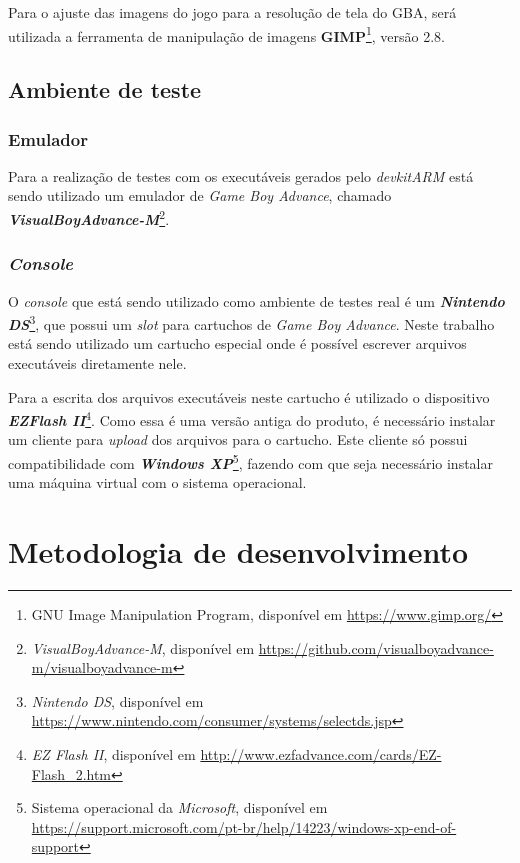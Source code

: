    Para o ajuste das imagens do jogo para a resolução de tela do GBA, será utilizada a ferramenta de manipulação de imagens \textbf{GIMP}\footnote{GNU Image Manipulation Program, disponível em \url{https://www.gimp.org/}}, versão 2.8.

  \subsection{Ambiente de teste}

    \subsubsection{Emulador}

      Para a realização de testes com os executáveis gerados pelo \textit{devkitARM} está sendo utilizado um emulador de \textit{Game Boy Advance}, chamado \textbf{\textit{VisualBoyAdvance-M}}\footnote{\textit{VisualBoyAdvance-M}, disponível em \url{https://github.com/visualboyadvance-m/visualboyadvance-m}}.

    \subsubsection{\textit{Console}} \label{console}

      O \textit {console} que está sendo utilizado como ambiente de testes real é um \textbf{\textit{Nintendo DS}}\footnote{\textit{Nintendo DS}, disponível em \url{https://www.nintendo.com/consumer/systems/selectds.jsp}}, que possui um \textit{slot} para cartuchos de \textit{Game Boy Advance}. Neste trabalho está sendo utilizado um cartucho especial onde é possível escrever arquivos executáveis diretamente nele.

      Para a escrita dos arquivos executáveis neste cartucho é utilizado o dispositivo \textbf{\textit{EZFlash II}}\footnote{\textit{EZ Flash II}, disponível em \url{http://www.ezfadvance.com/cards/EZ-Flash_2.htm}}. Como essa é uma versão antiga do produto, é necessário instalar um cliente para \textit{upload} dos arquivos para o cartucho. Este cliente só possui compatibilidade com \textit{\textbf{Windows XP}}\footnote{Sistema operacional da \textit{Microsoft}, disponível em \url{https://support.microsoft.com/pt-br/help/14223/windows-xp-end-of-support}}, fazendo com que seja necessário instalar uma máquina virtual com o sistema operacional.

\section{Metodologia de desenvolvimento}

